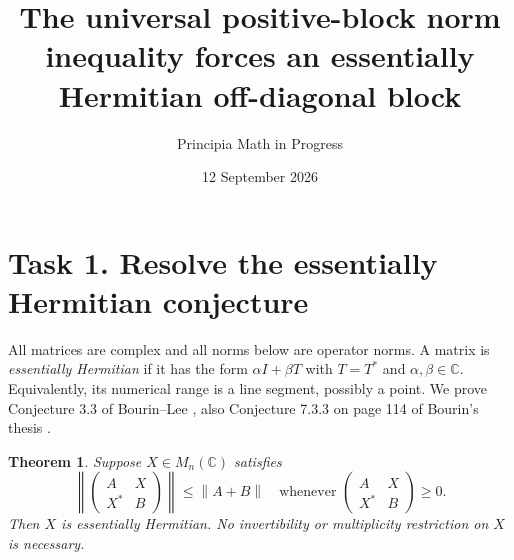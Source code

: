 \documentclass[11pt]{article}
\title{The universal positive-block norm inequality forces an essentially Hermitian off-diagonal block}
\author{Principia Math in Progress}
\date{12 September 2026}
\newcommand{\norm}[1]{\left\lVert#1\right\rVert}
\newtheorem{theorem}{Theorem}
\begin{document}
\maketitle

\section*{Task 1. Resolve the essentially Hermitian conjecture}
All matrices are complex and all norms below are operator norms. A matrix is
\emph{essentially Hermitian} if it has the form $\alpha I+\beta T$ with
$T=T^*$ and $\alpha,\beta\in\mathbb C$. Equivalently, its numerical range is
a line segment, possibly a point. We prove Conjecture 3.3 of Bourin--Lee
\cite{BL}, also Conjecture 7.3.3 on page 114 of Bourin's thesis \cite{B}.

\begin{theorem}
Suppose $X\in M_n(\mathbb C)$ satisfies
\begin{equation}\label{universal}
 \norm{\begin{pmatrix}A&X\\X^*&B\end{pmatrix}}
 \leq \norm{A+B}
 \quad\text{whenever }\begin{pmatrix}A&X\\X^*&B\end{pmatrix}\geq0.
\end{equation}
Then $X$ is essentially Hermitian. No invertibility or multiplicity
restriction on $X$ is necessary.
\end{theorem}
\end{document}
